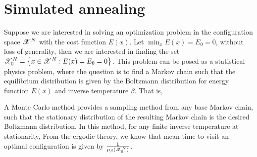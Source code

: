 \documentclass[letterpaper,english,10pt]{article}
\begin{document}
\section{Simulated annealing}
Suppose we are interested in solving an optimization problem in the configuration space $\mathscr{X}^N$ with the cost function $E(x)$. 
Let $\min_xE(x) = E_0 = 0$, without loss of generality, 
then we are interested in finding the set $\mathscr{X}^N_0 = \left\{x \in \mathscr{X}^N: E(x) = E_0 = 0\right\}$. 
This problem can be posed as a statistical-physics problem, where the question is to find a Markov chain such that the equilibrium distribution is given by the Boltzmann distribution for energy function $E(x)$ and inverse temperature $\beta$. 
That is, 

A Monte Carlo method provides a sampling method from any base Markov chain, 
such that the stationary distribution of the resulting Markov chain is the desired Boltzmann distribution. 
In this method, for any finite inverse temperature at stationarity, 
From the ergodic theory, we know that mean time to visit an optimal configuration is given by $\frac{1}{\mu_\beta(\mathscr{X}_0^N)}$. 
\end{document}
